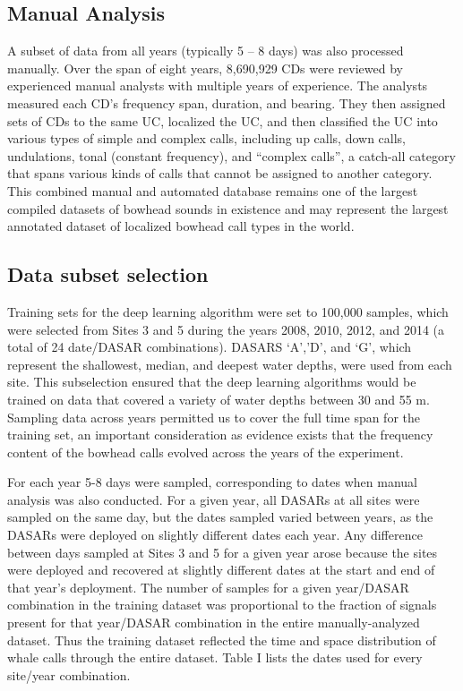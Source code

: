 \documentclass[preprint,NumberedRefs]{JASAnew}
\begin{document}
\subsection{Manual Analysis}

A subset of data from all years (typically 5 – 8 days) was also processed manually. Over the span of eight years, 8,690,929 CDs were reviewed by experienced manual analysts with multiple years of experience.  The analysts measured each CD's frequency span, duration, and bearing.  They then assigned sets of CDs to the same UC, localized the UC, and then classified the UC into various types of simple and complex calls, including up calls, down calls, undulations, tonal (constant frequency), and “complex calls”, a catch-all category that spans various kinds of calls that cannot be assigned to another category.  This combined manual and automated database remains one of the largest compiled datasets of bowhead sounds in existence and may represent the largest annotated dataset of localized bowhead call types in the world.

\subsection{Data subset selection}
Training sets for the deep learning algorithm were set to 100,000 samples, which were selected from Sites 3 and 5 during the years 2008, 2010, 2012, and 2014 (a total of 24 date/DASAR combinations).  DASARS ‘A’,’D’, and ‘G’, which represent the shallowest, median, and deepest water depths, were used from each site.   This subselection ensured that the deep learning algorithms would be trained on data that covered a variety of water depths between 30 and 55 m.   Sampling data across years permitted us to cover the full time span for the training set, an important consideration as evidence exists that the frequency content of the bowhead calls evolved across the years of the experiment\cite{thode2017decadal}.  

For each year 5-8 days were sampled, corresponding to dates when manual analysis was also conducted.  For a given year, all DASARs at all sites were sampled on the same day, but the dates sampled varied between years, as the DASARs were deployed on slightly different dates each year.  Any difference between days sampled at Sites 3 and 5 for a given year arose because the sites were deployed and recovered at slightly different dates at the start and end of that year’s deployment.  The number of samples for a given year/DASAR combination in the training dataset was proportional to the fraction of signals present for that year/DASAR combination in the entire manually-analyzed dataset.  Thus the training dataset reflected the time and space distribution of whale calls through the entire dataset.  Table I lists the dates used for every site/year combination.  
\end{document}
